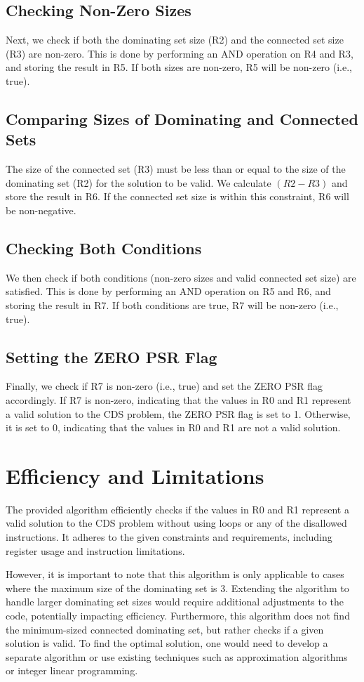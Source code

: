 \subsection{Checking Non-Zero Sizes}
Next, we check if both the dominating set size (R2) and the connected set size (R3) are non-zero. This is done by performing an AND operation on R4 and R3, and storing the result in R5. If both sizes are non-zero, R5 will be non-zero (i.e., true).

\subsection{Comparing Sizes of Dominating and Connected Sets}
The size of the connected set (R3) must be less than or equal to the size of the dominating set (R2) for the solution to be valid. We calculate $(R2 - R3)$ and store the result in R6. If the connected set size is within this constraint, R6 will be non-negative.

\subsection{Checking Both Conditions}
We then check if both conditions (non-zero sizes and valid connected set size) are satisfied. This is done by performing an AND operation on R5 and R6, and storing the result in R7. If both conditions are true, R7 will be non-zero (i.e., true).

\subsection{Setting the ZERO PSR Flag}
Finally, we check if R7 is non-zero (i.e., true) and set the ZERO PSR flag accordingly. If R7 is non-zero, indicating that the values in R0 and R1 represent a valid solution to the CDS problem, the ZERO PSR flag is set to 1. Otherwise, it is set to 0, indicating that the values in R0 and R1 are not a valid solution.

\section{Efficiency and Limitations}
The provided algorithm efficiently checks if the values in R0 and R1 represent a valid solution to the CDS problem without using loops or any of the disallowed instructions. It adheres to the given constraints and requirements, including register usage and instruction limitations.

However, it is important to note that this algorithm is only applicable to cases where the maximum size of the dominating set is 3. Extending the algorithm to handle larger dominating set sizes would require additional adjustments to the code, potentially impacting efficiency. Furthermore, this algorithm does not find the minimum-sized connected dominating set, but rather checks if a given solution is valid. To find the optimal solution, one would need to develop a separate algorithm or use existing techniques such as approximation algorithms or integer linear programming.

